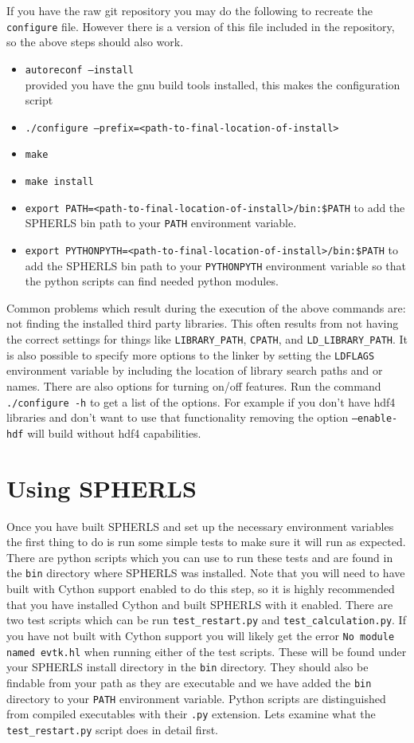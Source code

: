 \documentclass[12pt,a4paper]{book}
\begin{document}
If you have the raw git repository you may do the following to recreate the {\tt configure} file. However there is a version of this file included in the repository, so the above steps should also work.
\begin{itemize}
\item {\tt autoreconf --install} \\provided you have the gnu build tools installed, this makes the configuration script
\item {\tt ./configure --prefix=<path-to-final-location-of-install>}
\item {\tt make}
\item {\tt make install}
\item {\tt export PATH=<path-to-final-location-of-install>/bin:\$PATH} to add the SPHERLS bin path to your {\tt PATH} environment variable.
\item {\tt export PYTHONPYTH=<path-to-final-location-of-install>/bin:\$PATH} to add the SPHERLS bin path to your {\tt PYTHONPYTH} environment variable so that the python scripts can find needed python modules.
\end{itemize}

Common problems which result during the execution of the above commands are: not finding the installed third party libraries. This often results from not having the correct settings for things like {\tt LIBRARY\_PATH}, {\tt CPATH}, and {\tt LD\_LIBRARY\_PATH}. It is also possible to specify more options to the linker by setting the {\tt LDFLAGS} environment variable by including the location of library search paths and or names. There are also options for turning on/off features. Run the command {\tt ./configure -h} to get a list of the options. For example if you don't have hdf4 libraries and don't want to use that functionality removing the option {\tt --enable-hdf} will build without hdf4 capabilities.

\chapter{Using SPHERLS}
Once you have built SPHERLS and set up the necessary environment variables the first thing to do is run some simple tests to make sure it will run as expected. There are python scripts which you can use to run these tests and are found in the {\tt bin} directory where SPHERLS was installed. Note that you will need to have built with Cython support enabled to do this step, so it is highly recommended that you have installed Cython and built SPHERLS with it enabled. There are two test scripts which can be run {\tt test\_restart.py} and {\tt test\_calculation.py}. If you have not built with Cython support you will likely get the error {\tt No module named evtk.hl} when running either of the test scripts. These will be found under your SPHERLS install directory in the {\tt bin} directory. They should also be findable from your path as they are executable and we have added the {\tt bin} directory to your {\tt PATH} environment variable. Python scripts are distinguished from compiled executables with their {\tt .py} extension. Lets examine what the {\tt test\_restart.py} script does in detail first.
\end{document}
